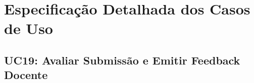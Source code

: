 \section{Especificação Detalhada dos Casos de Uso}
\label{sec_especificacao_uc_avaliacao}

\subsection{UC19: Avaliar Submissão e Emitir Feedback Docente}
\label{uc19_especificacao}

